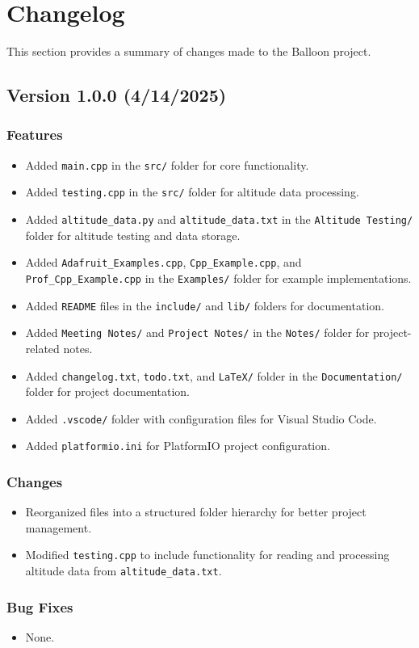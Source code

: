 \documentclass{article}
\begin{document}
\section{Changelog}
This section provides a summary of changes made to the Balloon project.



\subsection{Version 1.0.0 (4/14/2025)}
\subsubsection{Features}
\begin{itemize}
    \item Added \texttt{main.cpp} in the \texttt{src/} folder for core functionality.
    \item Added \texttt{testing.cpp} in the \texttt{src/} folder for altitude data processing.
    \item Added \texttt{altitude\_data.py} and \texttt{altitude\_data.txt} in the \texttt{Altitude Testing/} folder for altitude testing and data storage.
    \item Added \texttt{Adafruit\_Examples.cpp}, \texttt{Cpp\_Example.cpp}, and \texttt{Prof\_Cpp\_Example.cpp} in the \texttt{Examples/} folder for example implementations.
    \item Added \texttt{README} files in the \texttt{include/} and \texttt{lib/} folders for documentation.
    \item Added \texttt{Meeting Notes/} and \texttt{Project Notes/} in the \texttt{Notes/} folder for project-related notes.
    \item Added \texttt{changelog.txt}, \texttt{todo.txt}, and \texttt{LaTeX/} folder in the \texttt{Documentation/} folder for project documentation.
    \item Added \texttt{.vscode/} folder with configuration files for Visual Studio Code.
    \item Added \texttt{platformio.ini} for PlatformIO project configuration.
\end{itemize}



\subsubsection{Changes}
\begin{itemize}
    \item Reorganized files into a structured folder hierarchy for better project management.
    \item Modified \texttt{testing.cpp} to include functionality for reading and processing altitude data from \texttt{altitude\_data.txt}.
\end{itemize}



\subsubsection{Bug Fixes}
\begin{itemize}
    \item None.
\end{itemize}
\end{document}

